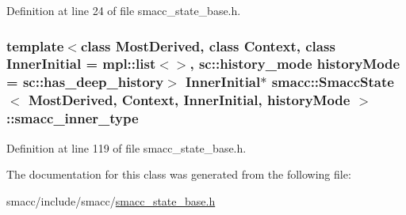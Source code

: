 Definition at line 24 of file smacc\+\_\+state\+\_\+base.\+h.

\subsubsection[{\texorpdfstring{smacc\+\_\+inner\+\_\+type}{smacc_inner_type}}]{\setlength{\rightskip}{0pt plus 5cm}template$<$class Most\+Derived, class Context, class Inner\+Initial = mpl\+::list$<$$>$, sc\+::history\+\_\+mode history\+Mode = sc\+::has\+\_\+deep\+\_\+history$>$ Inner\+Initial$\ast$ {\bf smacc\+::\+Smacc\+State}$<$ Most\+Derived, Context, Inner\+Initial, history\+Mode $>$\+::smacc\+\_\+inner\+\_\+type}\hypertarget{classsmacc_1_1SmaccState_a087d0f66729b98614feb8c59ea548af1}{}\label{classsmacc_1_1SmaccState_a087d0f66729b98614feb8c59ea548af1}


Definition at line 119 of file smacc\+\_\+state\+\_\+base.\+h.



The documentation for this class was generated from the following file\+:\begin{DoxyCompactItemize}
\item 
smacc/include/smacc/\hyperlink{smacc__state__base_8h}{smacc\+\_\+state\+\_\+base.\+h}\end{DoxyCompactItemize}
